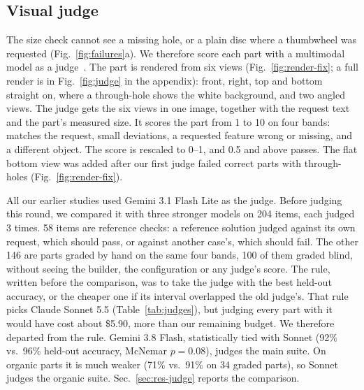 \subsection{Visual judge}
\label{sec:judge}
The size check cannot see a missing hole, or a plain disc where a thumbwheel was requested (Fig.~\ref{fig:failures}a).
We therefore score each part with a multimodal model as a judge~\cite{zheng2023judging}.
The part is rendered from six views (Fig.~\ref{fig:render-fix}; a full render is in Fig.~\ref{fig:judge} in the appendix): front, right, top and bottom straight on, where a through-hole shows the white background, and two angled views.
The judge gets the six views in one image, together with the request text and the part's measured size.
It scores the part from 1 to 10 on four bands: matches the request, small deviations, a requested feature wrong or missing, and a different object.
The score is rescaled to 0--1, and 0.5 and above passes.
The flat bottom view was added after our first judge failed correct parts with through-holes (Fig.~\ref{fig:render-fix}).

All our earlier studies used Gemini 3.1 Flash Lite as the judge.
Before judging this round, we compared it with three stronger models on 204 items, each judged 3 times.
58 items are reference checks: a reference solution judged against its own request, which should pass, or against another case's, which should fail.
The other 146 are parts graded by hand on the same four bands, 100 of them graded blind, without seeing the builder, the configuration or any judge's score.
The rule, written before the comparison, was to take the judge with the best held-out accuracy, or the cheaper one if its interval overlapped the old judge's.
That rule picks Claude Sonnet 5.5 (Table~\ref{tab:judges}), but judging every part with it would have cost about \$5.90, more than our remaining budget.
We therefore departed from the rule.
Gemini 3.8 Flash, statistically tied with Sonnet (92\% vs.\ 96\% held-out accuracy, McNemar $p = 0.08$), judges the main suite.
On organic parts it is much weaker (71\% vs.\ 91\% on 34 graded parts), so Sonnet judges the organic suite.
Sec.~\ref{sec:res-judge} reports the comparison.


